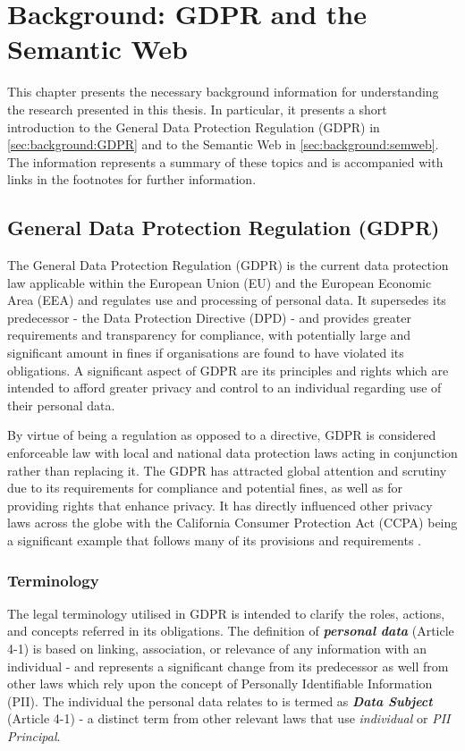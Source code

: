 \chapter{Background: GDPR and the Semantic Web}
\label{chapter:background}

This chapter presents the necessary background information for understanding the research presented in this thesis. In particular, it presents a short introduction to the General Data Protection Regulation (GDPR) in \autoref{sec:background:GDPR} and to the Semantic Web in \autoref{sec:background:semweb}. The information represents a summary of these topics and is accompanied with links in the footnotes for further information.

\section{General Data Protection Regulation (GDPR)}\label{sec:background:GDPR}
The General Data Protection Regulation (GDPR) \cite{Regulation_GDPR} is the current data protection law applicable within the European Union (EU) and the European Economic Area (EEA) and regulates use and processing of personal data. 
It supersedes its predecessor - the Data Protection Directive (DPD) \cite{directive_DPD} - and provides greater requirements and transparency for compliance, with potentially large and significant amount in fines if organisations are found to have violated its obligations.
A significant aspect of GDPR are its principles and rights which are intended to afford greater privacy and control to an individual regarding use of their personal data.

By virtue of being a regulation as opposed to a directive, GDPR is considered enforceable law with local and national data protection laws acting in conjunction rather than replacing it.
The GDPR has attracted global attention and scrutiny due to its requirements for compliance and potential fines, as well as for providing rights that enhance privacy.
It has directly influenced other privacy laws across the globe with the California Consumer Protection Act (CCPA) being a significant example that follows many of its provisions and requirements \cite{marini_gdpr_2018}.

\subsection{Terminology}
The legal terminology utilised in GDPR is intended to clarify the roles, actions, and concepts referred in its obligations.
The definition of \textit{\textbf{personal data}} (Article 4-1) is based on linking, association, or relevance of any information with an individual - and represents a significant change from its predecessor as well from other laws which rely upon the concept of Personally Identifiable Information (PII). The individual the personal data relates to is termed as \textit{\textbf{Data Subject}} (Article 4-1) - a distinct term from other relevant laws that use \textit{individual} or \textit{PII Principal}.

